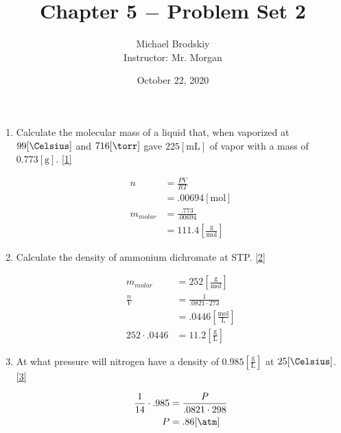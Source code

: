 \documentclass[12pt]{article}
\title{Chapter 5 $-$ Problem Set 2}
\date{October 22, 2020}
\author{Michael Brodskiy\\ \small Instructor: Mr. Morgan}
\begin{document}
\maketitle

\begin{enumerate}

  \item Calculate the molecular mass of a liquid that, when vaporized at $99[\si{\Celsius}]$ and $716[\si{\torr}]$ gave $225[\si{\milli\liter}]$ of vapor with a mass of $0.773[\si{\gram}]$. \eqref{1}

    \begin{equation}
      \begin{split}
        n&=\frac{PV}{RT}\\
        &=.00694[\si{\mole}]\\
        m_{molar}&=\frac{.773}{.00694}\\
        &=111.4\left[ \frac{\si{\gram}}{\si{\mole}} \right]
      \end{split}
      \label{1}
    \end{equation}

  \item Calculate the density of ammonium dichromate at STP. \eqref{2}

    \begin{equation}
      \begin{split}
        m_{molar}&=252\left[ \frac{\si{\gram}}{\si{\mole}} \right]\\
        \frac{n}{V}&=\frac{1}{.0821\cdot273}\\
        &=.0446\left[ \frac{\si{\mole}}{\si{\liter}} \right]\\
        252\cdot.0446&=11.2\left[ \frac{\si{\gram}}{\si{\liter}} \right]
      \end{split}
      \label{2}
    \end{equation}

  \item At what pressure will nitrogen have a density of $0.985\left[ \frac{\si{\gram}}{\si{\liter}} \right]$ at $25[\si{\Celsius}]$. \eqref{3}

    \begin{equation}
      \begin{split}
        \frac{1}{14}\cdot.985&=\frac{P}{.0821\cdot298}\\
        P&=.86[\si{\atm}]
      \end{split}
      \label{3}
    \end{equation}


\end{enumerate}
\end{document}
